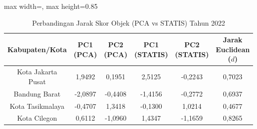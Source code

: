 \begin{table}[H]
\centering
\caption{Perbandingan Jarak Skor Objek (PCA vs STATIS) Tahun 2022} \label{tab:sample1jarak_skor_2022}
\begin{adjustbox}{max width=\textwidth, max height=0.85\textheight}
\begin{tabular}{|c|c|c|c|c|c|}
\hline
\textbf{Kabupaten/Kota} & \textbf{PC1 (PCA)} & \textbf{PC2 (PCA)} & \textbf{PC1 (STATIS)} & \textbf{PC2 (STATIS)} & \textbf{Jarak Euclidean ($d$)} \\
\hline
Kota Jakarta Pusat & 1,9492 & 0,1951 & 2,5125 & -0,2243 & 0,7023 \\
Bandung Barat & -2,0897 & -0,4408 & -1,4156 & -0,2772 & 0,6937 \\
Kota Tasikmalaya & -0,4707 & 1,3418 & -0,1300 & 1,0214 & 0,4677 \\
Kota Cilegon & 0,6112 & -1,0960 & 1,4347 & -1,1659 & 0,8265 \\
\hline
\end{tabular}
\end{adjustbox}
\end{table}